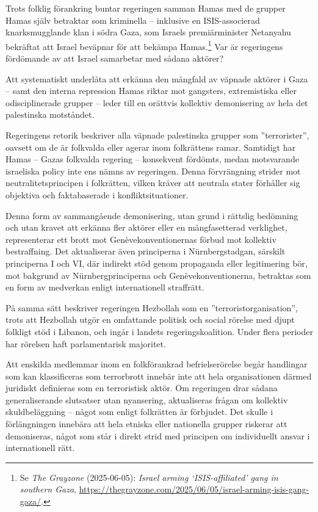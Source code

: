 Trots folklig förankring buntar regeringen samman Hamas med de grupper Hamas själv betraktar som kriminella – inklusive en ISIS-associerad 
knarksmugglande klan i södra Gaza, som Israels premiärminister Netanyahu 
bekräftat att Israel beväpnar för att bekämpa Hamas.\footnote{Se \textit{The Grayzone} (2025-06-05): \textit{Israel arming ‘ISIS-affiliated’ gang in southern Gaza}, \url{https://thegrayzone.com/2025/06/05/israel-arming-isis-gang-gaza/}.} Var är regeringens fördömande av att Israel samarbetar med sådana aktörer?

Att systematiskt underlåta att erkänna den mångfald av väpnade aktörer i Gaza – samt den 
interna repression Hamas riktar mot gangsters, extremistiska eller odisciplinerade grupper – leder till en orättvis 
kollektiv demonisering av hela det palestinska motståndet. 

Regeringens retorik beskriver alla väpnade palestinska grupper som ”terrorister”, oavsett om de är folkvalda eller 
agerar inom folkrättens ramar. Samtidigt har Hamas – Gazas folkvalda regering – konsekvent fördömts, medan motsvarande israeliska policy inte ens nämns av regeringen.
Denna förvrängning strider mot neutralitetsprincipen i folkrätten, vilken kräver att neutrala stater förhåller sig 
objektiva och faktabaserade i konfliktsituationer.

Denna form av sammangående demonisering, utan grund i rättslig bedömning och utan kravet att erkänna fler 
aktörer eller en mångfasetterad verklighet, representerar ett brott mot Genèvekonventionernas förbud mot kollektiv 
bestraffning. Det aktualiserar även principerna i Nürnbergstadgan, särskilt principerna I och VI, där indirekt stöd 
genom propaganda eller legitimering bör, mot bakgrund av Nürnbergprinciperna och Genèvekonventionerna, 
betraktas som en form av medverkan enligt internationell straffrätt.

På samma sätt beskriver regeringen Hezbollah som en ”terroristorganisation”, trots att Hezbollah utgör en omfattande 
politisk och social rörelse med djupt folkligt stöd i Libanon, och ingår i landets regeringskoalition. 
Under flera perioder har rörelsen haft parlamentarisk majoritet.

Att enskilda medlemmar inom en folkförankrad befrielserörelse begår handlingar som kan klassificeras som 
terrorbrott innebär inte att hela organisationen därmed juridiskt definieras som en terroristisk aktör. 
Om regeringen drar sådana generaliserande slutsatser utan nyansering, aktualiseras frågan om kollektiv skuldbeläggning – något 
som enligt folkrätten är förbjudet. Det skulle i förlängningen innebära att hela etniska eller nationella grupper 
riskerar att demoniseras, något som står i direkt strid med principen om individuellt ansvar i internationell rätt.

